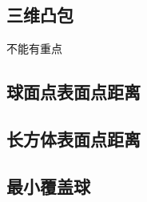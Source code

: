 \documentclass[landscape, twocolumn, 8pt, a4paper, twoside]{extarticle}
\begin{document}
\begin{spacing}{0.1}
  \subsection{三维凸包}
  不能有重点
  

  \subsection{球面点表面点距离}
  

  \subsection{长方体表面点距离}
  

  \subsection{最小覆盖球}
  


\end{spacing}
\end{document}
